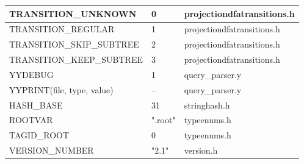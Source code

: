 \begin{tiny}
\begin{longtable}[ht]{|p{0.45\tablwidth}|p{0.15\tablwidth}|p{0.3\tablwidth}|}
  \newpage

  \mythickhline TRANSITION\_UNKNOWN & 0 & projectiondfatransitions.h \\
  \hline TRANSITION\_REGULAR & 1 & projectiondfatransitions.h \\
  \hline TRANSITION\_SKIP\_SUBTREE & 2 & projectiondfatransitions.h \\
  \hline TRANSITION\_KEEP\_SUBTREE & 3 & projectiondfatransitions.h \\
  \mythickhline YYDEBUG & 1 & query\_parser.y \\
  \hline YYPRINT(file, type, value) & -- & query\_parser.y \\
  \mythickhline HASH\_BASE & 31 & stringhash.h \\
  \mythickhline ROOTVAR & ".root" & typeenums.h  \\
  \hline TAGID\_ROOT & 0 & typeenums.h \\
  \mythickhline VERSION\_NUMBER & "2.1" & version.h \\
  \hline
\end{longtable}
\end{tiny}

\clearpage

